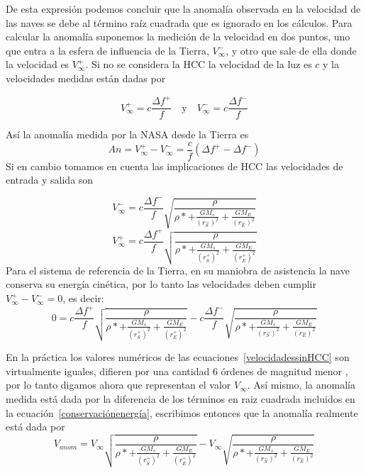 De esta expresión podemos concluir que la anomalía observada en la velocidad de las naves se debe al término raíz cuadrada que es ignorado en los cálculos. 
Para calcular la anomalía suponemos la medición de la velocidad en dos puntos, uno que entra a la esfera de influencia de la Tierra, $V^-_\infty$, y otro que sale de ella donde la velocidad es $V^+_\infty$. Si no se considera la \ac{HCC} la velocidad de la luz es $c$ y la velocidades medidas están dadas por

\begin{equation} \label{velocidadessinHCC}
V_\infty^+ = c\frac{\Delta f^+}{f} \quad \text{y} \quad V_\infty^- = c\frac{\Delta f^-}{f}
\end{equation}

Así la anomalía medida por la NASA desde la Tierra es
\begin{equation} \label{nasaanomaly}
    An = V^+_\infty - V^-_\infty= \frac{c}{f}(\Delta f^+ - \Delta f^-)
\end{equation}
Si en cambio tomamos en cuenta las implicaciones de \ac{HCC} las velocidades de entrada y salida son

\begin{equation}
      V^-_\infty = c \frac{\Delta f^-}{f} \sqrt{\frac{\rho}{\rho*+\frac{G M_s}{(r^-_S)^2} + \frac{GM_E}{(r^-_E)^2}} }
\end{equation}
\begin{equation} 
      V^+_\infty = c \frac{\Delta f^+}{f} \sqrt{\frac{\rho}{\rho*+\frac{G M_s}{(r^+_S)^2} + \frac{GM_E}{(r^+_E)^2}} }
\end{equation}
Para el sistema de referencia de la Tierra, en su maniobra de asistencia la nave conserva su energía cinética, por lo tanto las velocidades deben cumplir $V^+_\infty - V^-_\infty = 0$, es decir:
\begin{equation} \label{conservaciónenergía}
    0=c \frac{\Delta f^+}{f} \sqrt{\frac{\rho}{\rho*+\frac{G M_s}{(r^+_S)^2} + \frac{GM_E}{(r^+_E)^2}}} - c \frac{\Delta f^-}{f} \sqrt{\frac{\rho}{\rho*+\frac{G M_s}{(r^-_S)^2} + \frac{GM_E}{(r^-_E)^2}} }
\end{equation}

En la práctica los valores numéricos de las ecuaciones~\ref{velocidadessinHCC} son virtualmente iguales, difieren por una cantidad 6 órdenes de magnitud menor \cite{Greavesflyby}, por lo tanto digamos ahora que representan el valor $V_\infty$. Así mismo, la anomalía medida está dada por la diferencia de los términos en raiz cuadrada incluidos en la ecuación~\ref{conservaciónenergía}, escribimos entonces que la anomalía realmente está dada por 
\begin{equation} \label{flyanomalyREAL}
    V_{anom} = V_\infty \sqrt{\frac{\rho}{\rho*+\frac{G M_s}{(r^+_S)^2} + \frac{GM_E}{(r^+_E)^2}}} - V_\infty \sqrt{\frac{\rho}{\rho*+\frac{G M_s}{(r^-_S)^2} + \frac{GM_E}{(r^-_E)^2}} }
\end{equation}

